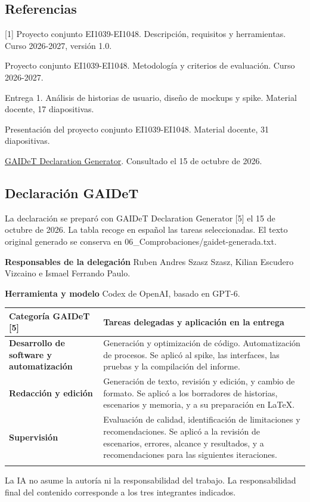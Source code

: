 \documentclass[11pt,a4paper]{article}
\begin{document}
\subsection*{Referencias}
[1] Proyecto conjunto EI1039-EI1048. Descripción, requisitos y herramientas. Curso 2026-2027, versión 1.0.\par
[2] Proyecto conjunto EI1039-EI1048. Metodología y criterios de evaluación. Curso 2026-2027.\par
[3] Entrega 1. Análisis de historias de usuario, diseño de mockups y spike. Material docente, 17 diapositivas.\par
[4] Presentación del proyecto conjunto EI1039-EI1048. Material docente, 31 diapositivas.\par
[5] \href{https://panbibliotekar.github.io/gaidet-declaration/}{GAIDeT Declaration Generator}. Consultado el 15 de octubre de 2026.\par
\subsection*{Declaración GAIDeT}
La declaración se preparó con GAIDeT Declaration Generator [5] el 15 de octubre de 2026. La tabla recoge en español las tareas seleccionadas. El texto original generado se conserva en 06\_Comprobaciones/gaidet-generada.txt.\par
\begingroup\fontsize{9.25}{11.7}\selectfont
\textbf{Responsables de la delegación} Ruben Andres Szasz Szasz, Kilian Escudero Vizcaino e Ismael Ferrando Paulo.\par
\textbf{Herramienta y modelo} Codex de OpenAI, basado en GPT-6.\par
\begin{tabularx}{\linewidth}{@{}p{3.5cm}Y@{}}\toprule
\textbf{Categoría GAIDeT [5]} & \textbf{Tareas delegadas y aplicación en la entrega}\\[2pt]\midrule
\textbf{Desarrollo de software y automatización} & Generación y optimización de código. Automatización de procesos. Se aplicó al spike, las interfaces, las pruebas y la compilación del informe.\\[2pt]\midrule[0.25pt]
\textbf{Redacción y edición} & Generación de texto, revisión y edición, y cambio de formato. Se aplicó a los borradores de historias, escenarios y memoria, y a su preparación en LaTeX.\\[2pt]\midrule[0.25pt]
\textbf{Supervisión} & Evaluación de calidad, identificación de limitaciones y recomendaciones. Se aplicó a la revisión de escenarios, errores, alcance y resultados, y a recomendaciones para las siguientes iteraciones.\\[2pt]\midrule[0.25pt]
\end{tabularx}\par
La IA no asume la autoría ni la responsabilidad del trabajo. La responsabilidad final del contenido corresponde a los tres integrantes indicados.\par
\endgroup
\end{document}
